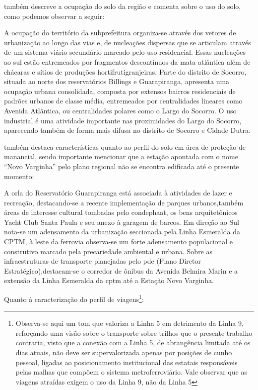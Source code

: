 	 também descreve a ocupação do solo da região e comenta sobre o uso do solo, como podemos observar a seguir:
	
	\begin{citacao}
		A ocupação do território da subprefeitura organiza-se através dos vetores de urbanização ao longo das vias e, de nucleações dispersas que se articulam através de um sistema viário secundário marcado pelo uso residencial. Essas nucleações ao sul estão entremeados por fragmentos descontínuos da mata atlântica além de chácaras e sítios de produções hortifrutigranjeiras. Parte do distrito de Socorro, situada ao norte dos reservatórios Billings e Guarapiranga, apresenta uma ocupação urbana consolidada, composta por extensos bairros residenciais de padrões urbanos de classe média, entremeados por centralidades lineares como Avenida Atlântica, ou centralidades polares como o Largo do Socorro. O uso industrial é uma atividade importante nas proximidades do Largo do Socorro, aparecendo também de forma mais difusa no distrito de Socorro e Cidade Dutra.
	\end{citacao}
	
	 também destaca características quanto ao perfil do solo em área de proteção de manancial, sendo importante mencionar que a estação apontada com o nome ``Novo Varginha'' pelo plano regional não se encontra edificada até o presente momento:
	
	\begin{citacao}
		A orla do Reservatório Guarapiranga está associada à atividades de lazer e recreação, destacando-se a recente implementação de parques urbanos,também áreas de interesse cultural tombadas pelo \gls{condephaat}, os bens arquitetônicos Yacht Club Santa Paula e seu anexo à garagem de barcos. Em direção ao Sul nota-se um adensamento da urbanização seccionada pela Linha Esmeralda da CPTM, à leste da ferrovia observa-se um forte adensamento populacional e construtivo marcado pela precariedade ambiental e urbana. Sobre as infraestruturas de transporte planejadas pelo \gls{pde} (Plano Diretor Estratégico),destacam-se o corredor de ônibus da Avenida Belmira Marin e a extensão da Linha Esmeralda da \gls{cptm} até a Estação Novo Varginha.
	\end{citacao}
	
	Quanto à caracterização do perfil de viagens\footnote{Observa-se aqui um tom que valoriza a Linha 5 em detrimento da Linha 9, reforçando uma visão sobre o transporte sobre trilhos que o presente trabalho contraria, visto que a conexão com a Linha 5, de abrangência limitada até os dias atuais, não deve ser supervalorizada apenas por posições de cunho pessoal, ligadas ao posicionamento institucional das estatais responsáveis pelas malhas que compõem o sistema metroferroviário. Vale observar que as viagens atraídas exigem o uso da Linha 9, não da Linha 5}:
	
